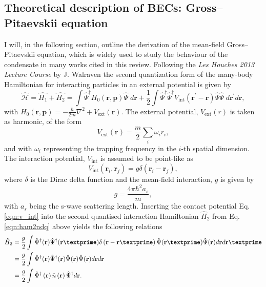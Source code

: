 \subsection{Theoretical description of BECs: Gross--Pitaevskii equation}\label{sub:gpederiv}
I will, in the following section, outline the derivation of the mean-field Gross--Pitaevskii equation, which is widely used to study the behaviour of the condensate in many works cited in this review. Following the \textit{Les Houches 2013 Lecture Course} by J. Walraven \cite{LEC:Walraven_lh_2013} the second quantization form of the many-body Hamiltonian for interacting particles in an external potential is given by
\begin{equation}\label{eqn:ham2ndq}
\hat{\mathcal{H}} = \hat{H_1} + \hat{H_2} = \int \hat{\Psi}^{\dagger} H_0\left(\textbf{r},\textbf{p} \right)  \hat{\Psi} \; d\textbf{r}  + \frac{1}{2} \int\hat{\Psi}^{\dagger}\hat{\Psi}^{\dagger}V_{\textrm{int}}(\textbf{r}^\prime-\textbf{r})\hat{\Psi}\hat{\Psi} \; d\textbf{r}^\prime d\textbf{r},
\end{equation}
with $H_0\left(\textbf{r}, \textbf{p} \right) = -\frac{\hbar}{2m}\nabla^2 + V_{\textrm{ext}}\left(\textbf{r}\right)$. The external potential, $V_{\text{ext}}(r)$ is taken as harmonic, of the form
\begin{equation}
V_{\text{ext}}(\textbf{r}) = \frac{m}{2}\displaystyle\sum_{i}{\omega_i r_i},
\end{equation}
and with $\omega_i$ representing the trapping frequency in the $i$-th spatial dimension. The interaction potential, $V_{\text{int}}$ is assumed to be point-like as
\begin{equation}\label{eqn:v_int}
	V_{\text{int}}\left(\textbf{r}_i,\textbf{r}_j \right) = g\delta\left(\textbf{r}_i - \textbf{r}_j\right),
\end{equation} where $\delta$ is the Dirac delta function and the mean-field interaction, $g$ is given by
\begin{equation}
	g = \frac{4\pi\hbar^2 a_s}{m},
\end{equation}
with $a_s$ being the s-wave scattering length. Inserting the contact potential Eq. \eqref{eqn:v_int} into the second quantised interaction Hamiltonian $\hat{H}_2$ from Eq. \eqref{eqn:ham2ndq} above yields the following relations
\begin{subequations}
\begin{align}
\hat{H}_2 &= \frac{g}{2} \int \hat{\Psi}^{\dagger}(\textbf{r})\hat{\Psi}^{\dagger}(\textbf{r\textprime}) \delta\left(\textbf{r} - \textbf{r\textprime}\right)\hat{\Psi}(\textbf{r\textprime})\hat{\Psi}(\textbf{r})d\textbf{r}d\textbf{r\textprime} \\
 & = \frac{g}{2}\int \hat{\Psi}^{\dagger}(\textbf{r})\hat{\Psi}^{\dagger}(\textbf{r}) \hat{\Psi}(\textbf{r})\hat{\Psi}(\textbf{r})d\textbf{r}d\textbf{r} \\
 & = \frac{g}{2}\int \hat{\Psi}^{\dagger}\left(\textbf{r}\right)\hat{n}\left(\textbf{\textbf{r}}\right)\hat{\Psi}^{\dagger}d\textbf{r}.
\end{align}
\end{subequations}

